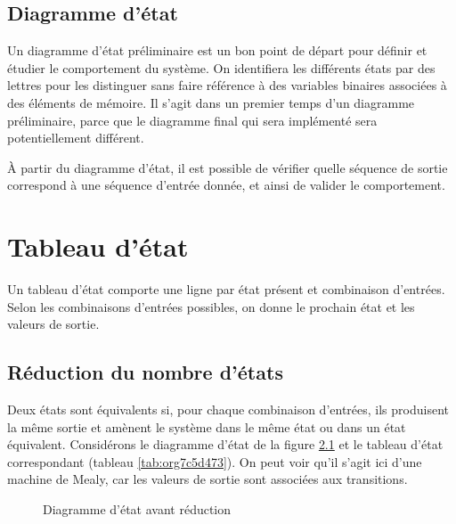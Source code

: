 \documentclass[letter, oneside]{book}
\begin{document}
\section{Diagramme d'état}
\label{sec:orgb02d113}

Un diagramme d'état préliminaire est un bon point de départ pour
définir et étudier le comportement du système. On identifiera les
différents états par des lettres pour les distinguer sans faire
référence à des variables binaires associées à des éléments de
mémoire. Il s'agit dans un premier temps d'un diagramme préliminaire,
parce que le diagramme final qui sera implémenté sera potentiellement
différent.

À partir du diagramme d'état, il est possible de vérifier quelle
séquence de sortie correspond à une séquence d'entrée donnée, et ainsi
de valider le comportement.

\chapter{Tableau d'état}
\label{sec:org3f265af}

Un tableau d'état comporte une ligne par état présent et combinaison
d'entrées. Selon les combinaisons d'entrées possibles, on donne le
prochain état et les valeurs de sortie.

\section{Réduction du nombre d'états}
\label{sec:org1f67fc9}

Deux états sont équivalents si, pour chaque combinaison d'entrées, ils
produisent la même sortie et amènent le système dans le même état ou
dans un état équivalent. Considérons le diagramme d'état de la figure
\ref{fig:org84b72a3} et le tableau d'état correspondant (tableau 
\ref{tab:org7c5d473}). On peut voir qu'il s'agit ici d'une machine de
Mealy, car les valeurs de sortie sont associées aux transitions.


\begin{figure}[htbp]
\centering

\caption{\label{fig:org84b72a3}Diagramme d'état avant réduction}
\end{figure}
\end{document}
